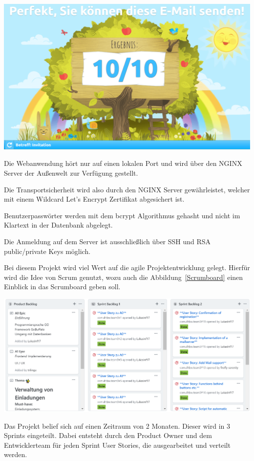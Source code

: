 \documentclass[landscape,a0paper,fontscale=0.35]{baposter} %
\begin{document}
\begin{poster}
{	\begin{center}
		\includegraphics[width=0.5\linewidth]{E-Mail_test.PNG}
		\label{E-Mail_Tester}
	\end{center}

	Die Webanwendung hört nur auf einen lokalen Port und wird über den NGINX Server der Außenwelt zur Verfügung gestellt.
	
	Die Transportsicherheit wird also durch den NGINX Server gewährleistet, welcher mit einem Wildcard Let's Encrypt Zertifikat abgesichert ist.
	
	Benutzerpasswörter werden mit dem bcrypt Algorithmus gehasht und nicht im Klartext in der Datenbank abgelegt.
	
	Die Anmeldung auf dem Server ist ausschließlich über SSH und RSA public/private Keys möglich. 
	\vspace{1.2em}
}


{ %
	Bei diesem Projekt wird viel Wert auf die agile Projektentwicklung gelegt. Hierfür wird die Idee von Scrum genutzt, wozu auch die Abbildung~\ref{Scrumboard} einen Einblick in das Scrumboard geben soll. 
	\begin{center}
		\includegraphics[width=0.63\linewidth]{Scrum_Board_GitHub2.PNG}
		\label{Scrumboard}
	\end{center}

	Das Projekt belief sich auf einen Zeitraum von 2 Monaten. Dieser wird in 3 Sprints eingeteilt. Dabei entsteht durch den Product Owner und dem Entwicklerteam für jeden Sprint User Stories, die ausgearbeitet und verteilt werden.

}
\end{poster}
\end{document}

